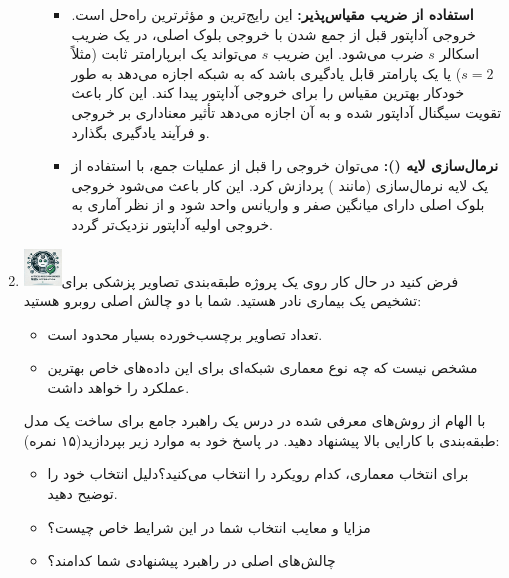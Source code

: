 \documentclass[12pt]{article}
\begin{document}
\begin{enumerate}
\begin{enumerate}
{        \begin{itemize}
            \item \textbf{استفاده از ضریب مقیاس‌پذیر:} این رایج‌ترین و مؤثرترین راه‌حل است. خروجی آداپتور قبل از جمع شدن با خروجی بلوک اصلی، در یک ضریب اسکالر $s$ ضرب می‌شود. این ضریب $s$ می‌تواند یک ابرپارامتر ثابت (مثلاً $s=2$) یا یک پارامتر قابل یادگیری باشد که به شبکه اجازه می‌دهد به طور خودکار بهترین مقیاس را برای خروجی آداپتور پیدا کند. این کار باعث تقویت سیگنال آداپتور شده و به آن اجازه می‌دهد تأثیر معناداری بر خروجی و فرآیند یادگیری بگذارد.
            \item \textbf{نرمال‌سازی لایه ():} می‌توان خروجی  را قبل از عملیات جمع، با استفاده از یک لایه نرمال‌سازی (مانند ) پردازش کرد. این کار باعث می‌شود خروجی بلوک اصلی دارای میانگین صفر و واریانس واحد شود و از نظر آماری به خروجی اولیه آداپتور نزدیک‌تر گردد.
        \end{itemize}
        }
    \end{enumerate}

    \item \includegraphics[width=1cm]{figs/Allowed_recommended.jpg}فرض کنید در حال کار روی یک پروژه طبقه‌بندی تصاویر پزشکی برای تشخیص یک بیماری نادر هستید. شما با دو چالش اصلی روبرو هستید:
        \begin{itemize}
            \item تعداد تصاویر برچسب‌خورده بسیار محدود است.
            \item مشخص نیست که چه نوع معماری شبکه‌ای برای این داده‌های خاص بهترین عملکرد را خواهد داشت.
        \end{itemize}
        با الهام از روش‌های معرفی شده در درس یک راهبرد جامع برای ساخت یک مدل طبقه‌بندی با کارایی بالا پیشنهاد دهید. در پاسخ خود به موارد زیر بپردازید(۱۵ نمره):
        \begin{itemize}
            \item برای انتخاب معماری، کدام رویکرد را انتخاب می‌کنید؟دلیل انتخاب خود را توضیح دهید.
            \item مزایا و معایب انتخاب شما در این شرایط خاص چیست؟
            \item چالش‌های اصلی در راهبرد پیشنهادی شما کدامند؟
        \end{itemize}


\end{enumerate}
\end{document}
